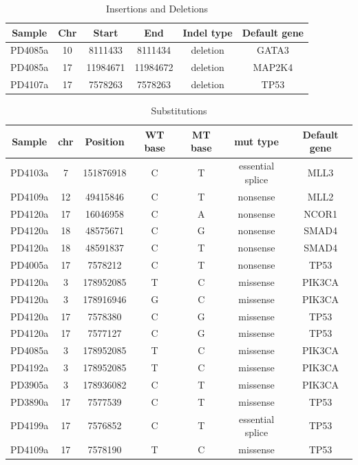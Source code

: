 \documentclass[11pt]{amsart}
\theoremstyle{definition}
\begin{document}
\begin{table}
\begin{center}
\begin{tabular}{cccccc}%
  {\bf Sample}& {\bf Chr} & {\bf Start} & {\bf End} & {\bf Indel type}
  & {\bf Default gene} \\ \hline
  PD4085a& 10 & 8111433  & 8111434  & deletion & GATA3  \\ %
  PD4085a& 17 & 11984671 & 11984672 & deletion & MAP2K4 \\ %
  PD4107a& 17 & 7578263  & 7578263  & deletion & TP53   \\[1em] %
\end{tabular}\caption{Insertions and Deletions}\label{tab:tableB}
\end{center}
\end{table}

\begin{table}
\begin{center}
\begin{tabular}{ccccccc}%
  {\bf Sample}& {\bf chr} & {\bf Position} & {\bf WT base}
    & {\bf MT base} & {\bf mut type} & {\bf Default gene}\\ \hline
  PD4103a& 7   &151876918  &   C&  T &  essential splice& MLL3  \\ %
  PD4109a& 12  &49415846   &   C&  T &  nonsense& MLL2  \\ %
  PD4120a& 17  &16046958   &   C&  A &  nonsense& NCOR1 \\ %
  PD4120a& 18  &48575671   &   C&  G &  nonsense& SMAD4 \\ %
  PD4120a& 18  &48591837   &   C&  T &  nonsense& SMAD4 \\ %
  PD4005a& 17  &7578212    &   C&  T &  nonsense& TP53  \\ %
  PD4120a& 3   &178952085  &   T&  C &  missense& PIK3CA\\ %
  PD4120a& 3   &178916946  &   G&  C &  missense& PIK3CA\\ %
  PD4120a& 17  &7578380    &   C&  G &  missense& TP53  \\ %
  PD4120a& 17  &7577127    &   C&  G &  missense& TP53  \\ %
  PD4085a& 3   &178952085  &   T&  C &  missense& PIK3CA\\ %
  PD4192a& 3   &178952085  &   T&  C &  missense& PIK3CA\\ %
  PD3905a& 3   &178936082  &   C&  T &  missense& PIK3CA\\ %
  PD3890a& 17  &7577539    &   C&  T &  missense& TP53  \\ %
  PD4199a& 17  &7576852    &   C&  T &  essential splice& TP53  \\ %
  PD4109a& 17  &7578190    &   T&  C&   missense& TP53  \\[1em] %
\end{tabular}\caption{Substitutions}\label{tab:tableC}
\end{center}
\end{table}
\end{document}
